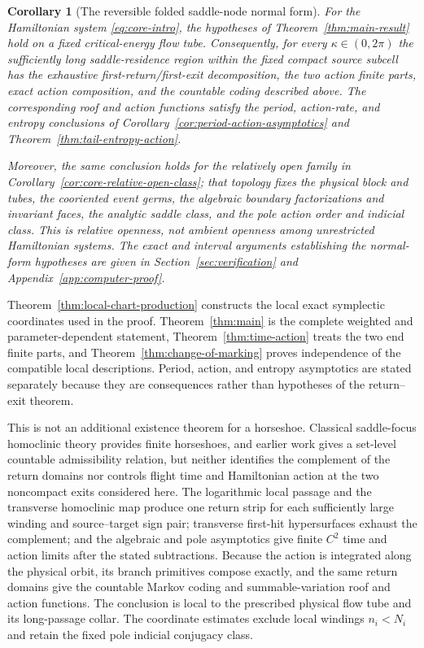 \documentclass[11pt]{amsart}
\numberwithin{equation}{section}
\newtheorem{corollary}[theorem]{Corollary}
\theoremstyle{definition}
\theoremstyle{remark}
\begin{document}
\begin{corollary}[The reversible folded saddle-node normal form]
\label{cor:core}
For the Hamiltonian system \eqref{eq:core-intro}, the hypotheses of
Theorem~\ref{thm:main-result} hold on a fixed critical-energy flow tube.
Consequently, for every $\kappa\in(0,2\pi)$ the sufficiently long
saddle-residence region within the fixed compact source subcell has the
exhaustive first-return/first-exit decomposition, the two action finite
parts, exact action composition, and the countable coding described above.
The corresponding roof and action functions satisfy the period,
action-rate, and entropy conclusions of
Corollary~\ref{cor:period-action-asymptotics} and
Theorem~\ref{thm:tail-entropy-action}.

Moreover, the same conclusion holds for the relatively open family in
Corollary~\ref{cor:core-relative-open-class}; that topology fixes the
physical block and tubes, the cooriented event germs, the algebraic
boundary factorizations and invariant faces, the analytic saddle class,
and the pole action order and indicial class.  This is relative openness,
not ambient openness among unrestricted Hamiltonian systems.
The exact and interval arguments establishing the normal-form hypotheses
are given in Section~\ref{sec:verification} and
Appendix~\ref{app:computer-proof}.
\end{corollary}

Theorem~\ref{thm:local-chart-production} constructs the local exact
symplectic coordinates used in the proof.  Theorem~\ref{thm:main} is the
complete weighted and parameter-dependent statement,
Theorem~\ref{thm:time-action} treats the two end finite parts, and
Theorem~\ref{thm:change-of-marking} proves independence of the compatible
local descriptions.  Period, action, and entropy asymptotics are stated
separately because they are consequences rather than hypotheses of the
return--exit theorem.

This is not an additional existence theorem for a horseshoe.  Classical
saddle-focus homoclinic theory provides finite horseshoes, and earlier work
gives a set-level countable admissibility relation, but neither identifies
the complement of the return domains nor controls flight time and
Hamiltonian action at the two noncompact exits considered here.  The
logarithmic local passage and the transverse homoclinic map produce one
return strip for each sufficiently large winding and source--target sign
pair; transverse first-hit hypersurfaces exhaust the complement; and the
algebraic and pole asymptotics give finite $C^2$ time and action limits
after the stated subtractions.  Because the action is integrated along the
physical orbit, its branch primitives compose exactly, and the same return
domains give the countable Markov coding and summable-variation roof and
action functions.  The conclusion is local to the prescribed physical
flow tube and its long-passage collar.  The coordinate estimates exclude
local windings $n_i<N_i$ and retain the fixed pole indicial conjugacy class.
\end{document}
